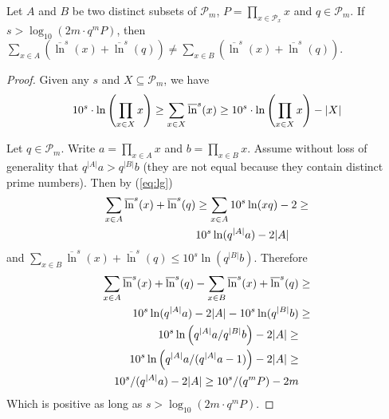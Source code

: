 \begin{proposition}
\label{prop:converge}
Let $A$ and $B$ be two distinct subsets of $\mathcal{P}_m$, $P = \prod_{x \in \mathcal{P}_x} x$ and $q \in \mathcal{P}_m$. If $s > \log_{10} \left( 2 m \cdot q^m P \right)$, 
then $\sum_{x \in A} \left( \overline{\ln}^s(x) + \overline{\ln}^s(q) \right) \neq \sum_{x \in B} \left( \overline{\ln}^s(x) + \overline{\ln}^s(q) \right)$.
\end{proposition}

\begin{proof}
Given any $s$ and $X \subseteq \mathcal{P}_m$, we have
\begin{equation}
\small
\label{eq:lg}
10^s \cdot \ln \left( \prod_{x \in X} x \right) \geq \sum_{x \in X} \overline{\ln}^s(x) \geq 10^s \cdot \ln \left( \prod_{x \in X} x \right) - |X|
\end{equation}

Let $q \in \mathcal{P}_m$. Write $a = \prod_{x \in A} x$ and $b = \prod_{x \in B} x$. Assume without loss of generality that $q^{|A|} a > q^{|B|} b$ (they are not equal because they contain distinct prime numbers). 
Then by (\ref{eq:lg})
\begin{align*}
\tiny
\sum_{x \in A} \overline{\ln}^s(x) +  \overline{\ln}^s(q) & \geq \sum_{x \in A} 10^s \ln(x q) - 2 \geq \\
& 10^s \ln(q^{|A|} a) - 2 |A|
\end{align*}
and $\sum_{x \in B} \overline{\ln}^s(x) + \overline{\ln}^s(q) \leq 10^s \ln (q^{|B|} b)$. Therefore
\begin{align*}
\tiny
\sum_{x \in A} \overline{\ln}^s(x) +  \overline{\ln}^s(q) - \sum_{x \in B} \overline{\ln}^s(x) + \overline{\ln}^s(q) & \geq \\
10^s \ln(q^{|A|} a) - 2 |A| - 10^s \ln (q^{|B|} b) & \geq \\
10^s  \ln \left(q^{|A|} a \slash q^{|B|} b \right) - 2 |A| \geq & \\
10^s  \ln \left(q^{|A|} a \slash (q^{|A|} a - 1) \right) - 2 |A| \geq & \\
10^s \slash (q^{|A|} a) - 2|A| \geq 10^s \slash (q^m P) - 2m
\end{align*}
Which is positive as long as $s > \log_{10} \left( 2 m \cdot q^m P \right)$.
\end{proof}


